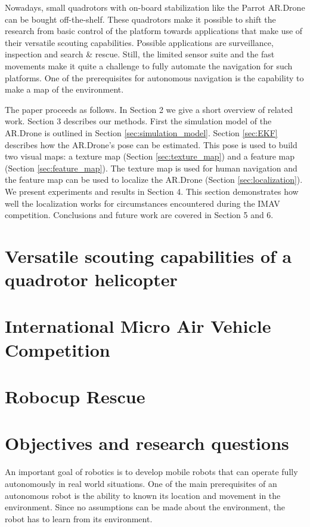 Nowadays, small quadrotors with on-board stabilization like the Parrot AR.Drone can be bought off-the-shelf.
These quadrotors make it possible to shift the research from basic control of the platform towards applications that make use of their versatile scouting capabilities. Possible applications are surveillance, inspection and search \& rescue. Still, the limited sensor suite and the fast movements make it quite a challenge to fully automate the navigation for such platforms. One of the prerequisites for autonomous navigation is the capability to make a map of the environment. 

The paper proceeds as follows. 
In Section 2 we give a short overview of related work.
Section 3 describes our methods.
First the simulation model of the AR.Drone is outlined in Section \ref{sec:simulation_model}.
Section \ref{sec:EKF} describes how the AR.Drone's pose can be estimated.
This pose is used to build two visual maps: a texture map (Section \ref{sec:texture_map}) and a feature map (Section \ref{sec:feature_map}).
The texture map is used for human navigation and the feature map can be used to localize the AR.Drone (Section \ref{sec:localization}).
We present experiments and results in Section 4.
This section demonstrates how well the localization works for circumstances encountered during the IMAV competition. 
Conclusions and future work are covered in Section 5 and 6.

	\section{Versatile scouting capabilities of a quadrotor helicopter}
	\section{International Micro Air Vehicle Competition}
	\section{Robocup Rescue}

	\section{Objectives and research questions}
An important goal of robotics is to develop mobile robots that can operate fully autonomously in real world situations.
One of the main prerequisites of an autonomous robot is the ability to known its location and movement in the environment.
Since no assumptions can be made about the environment, the robot has to learn from its environment.

